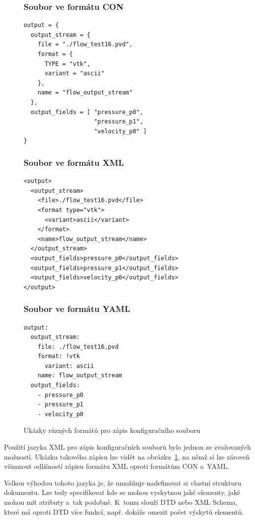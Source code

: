 \documentclass[FM,bw,DP]{tulthesis}
\begin{document}
\begin{figure}[H]
\singlespacing
\subsubsection*{Soubor ve formátu CON}
\begin{lstlisting}
output = {
  output_stream = {
    file = "./flow_test16.pvd", 
    format = {
      TYPE = "vtk", 
      variant = "ascii"
    }, 
    name = "flow_output_stream"
  }, 
  output_fields = [ "pressure_p0",
                    "pressure_p1", 
                    "velocity_p0" ]
}
\end{lstlisting}

\subsubsection*{Soubor ve formátu XML}
\begin{lstlisting}
<output>
  <output_stream>
  	<file>./flow_test16.pvd</file>
  	<format type="vtk">
  	  <variant>ascii</variant>
  	</format>
  	<name>flow_output_stream</name>
  </output_stream>
  <output_fields>pressure_p0</output_fields>
  <output_fields>pressure_p1</output_fields>
  <output_fields>velocity_p0</output_fields>
</output>
\end{lstlisting}

\subsubsection*{Soubor ve formátu YAML}
\begin{lstlisting}
output:
  output_stream:
  	file: ./flow_test16.pvd
  	format: !vtk
  	  variant: ascii
  	name: flow_output_stream
  output_fields:
    - pressure_p0
    - pressure_p1
    - velocity_p0
\end{lstlisting}
\onehalfspacing
\caption{Ukázky různých formátů pro zápis konfiguračního souboru}
\label{img:conf_files}
\end{figure}

Použití jazyka \gls{XML} pro zápis konfiguračních souborů bylo jednou ze zvažovaných možností. Ukázku takového zápisu lze vidět na obrázku~\ref{img:conf_files}, na němž si lze zároveň všimnout odlišností zápisu formátu XML oproti formátům \gls{CON} a~\gls{YAML}. 

Velkou výhodou tohoto jazyka je, že umožňuje nadefinovat si vlastní strukturu dokumentu. Lze tedy specifikovat kde se mohou vyskytnou jaké elementy, jaké mohou mít atributy a~tak podobně. K~tomu slouží \gls{DTD} nebo \gls{XML} Schema, které má oproti \gls{DTD} více funkcí, např. dokáže omezit počet výskytů elementů.
\end{document}
